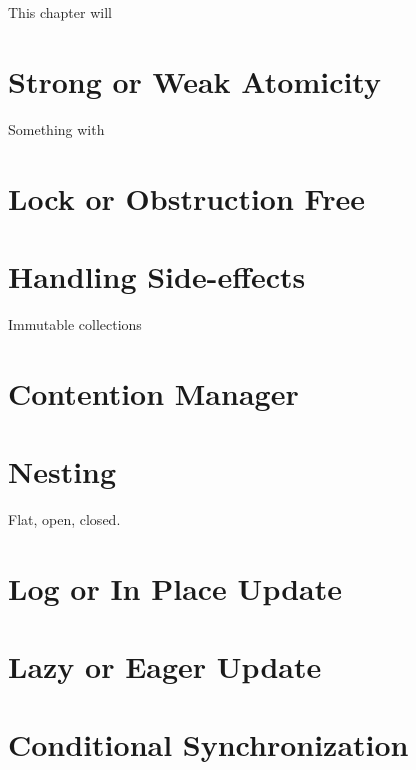 \makeatletter {}\makeatother
{}
This chapter will
\section{Strong or Weak Atomicity}
Something with\cite[p. 1]{harris2003language}
\section{Lock or Obstruction Free}
\section{Handling Side-effects}
Immutable collections
\section{Contention Manager}
\section{Nesting}
Flat, open, closed.
\section{Log or In Place Update}
\section{Lazy or Eager Update}
\section{Conditional Synchronization}


\worksheetend